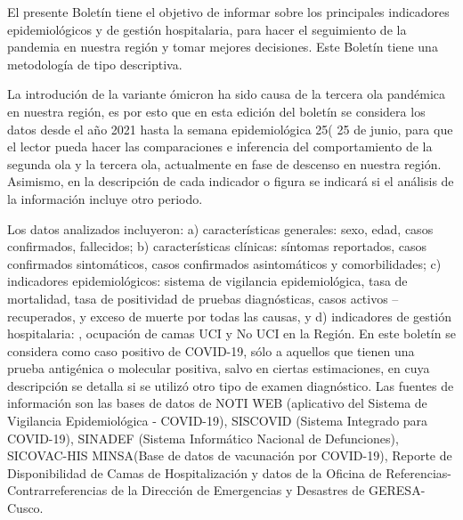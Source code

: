 \documentclass[12pt,a4paper,openany]{book}
\begin{document}
	\noindent El presente Boletín tiene el objetivo de informar sobre los principales indicadores epidemiológicos y
	de gestión hospitalaria, para hacer el seguimiento de la pandemia en nuestra región y tomar mejores decisiones. Este Boletín tiene una metodología de tipo descriptiva.
	
	
	La introdución de la variante ómicron ha sido causa de la tercera ola pandémica en nuestra
	región, es por esto que en esta edición del boletín se considera los datos desde el año 2021 hasta la
	semana epidemiológica  25( 25 de junio, para que el lector pueda hacer las comparaciones
	e inferencia del comportamiento de la segunda ola y la tercera ola, actualmente en fase de descenso
	en nuestra región. Asimismo, en la descripción de cada indicador o figura se indicará si el análisis de
	la información incluye otro periodo.
	
	
	Los datos analizados incluyeron: a) características generales: sexo, edad, casos confirmados,
	fallecidos; b) características clínicas: síntomas reportados, casos confirmados sintomáticos, casos
	confirmados asintomáticos y comorbilidades; c) indicadores epidemiológicos: sistema de vigilancia
	epidemiológica, tasa de mortalidad, tasa de positividad de pruebas diagnósticas, casos activos –
	recuperados, y exceso de muerte por todas las causas, y d) indicadores de gestión hospitalaria: ,
	ocupación de camas UCI y No UCI en la Región. En este boletín se considera como caso positivo de
	COVID-19, sólo a aquellos que tienen una prueba antigénica o molecular positiva, salvo en ciertas
	estimaciones, en cuya descripción se detalla si se utilizó otro tipo de examen diagnóstico.
	Las fuentes de información son las bases de datos de NOTI WEB (aplicativo del Sistema de
	Vigilancia Epidemiológica - COVID-19), SISCOVID (Sistema Integrado para COVID-19), SINADEF
	(Sistema Informático Nacional de Defunciones), SICOVAC-HIS MINSA(Base de datos de vacunación
	por COVID-19), Reporte de Disponibilidad de Camas de Hospitalización y datos de la Oficina de
	Referencias-Contrarreferencias de la Dirección de Emergencias y Desastres de GERESA-Cusco.
	
	
\end{document}
